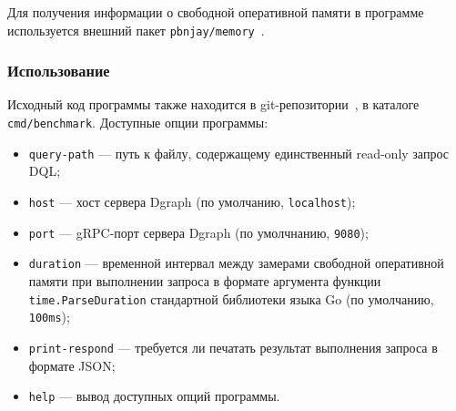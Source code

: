 Для получения информации о свободной оперативной памяти в программе используется внешний пакет
\texttt{pbnjay/memory}~\cite{pbnjayMemory}.

\subsubsection{Использование}

Исходный код программы также находится в git-репозитории~\cite{sources}, в каталоге \texttt{cmd/benchmark}. Доступные
опции программы:
\begin{itemize}
  \item \texttt{query-path} --- путь к файлу, содержащему единственный read-only запрос DQL;
  \item \texttt{host} --- хост сервера Dgraph (по умолчанию, \texttt{localhost});
  \item \texttt{port} --- gRPC-порт сервера Dgraph (по умолчнанию, \texttt{9080});
  \item \texttt{duration} --- временной интервал между замерами свободной оперативной памяти при выполнении запроса в
    формате аргумента функции \texttt{time.ParseDuration} стандартной библиотеки языка Go (по умолчанию,
    \texttt{100ms});
  \item \texttt{print-respond} --- требуется ли печатать результат выполнения запроса в формате JSON;
  \item \texttt{help} --- вывод доступных опций программы.
\end{itemize}
